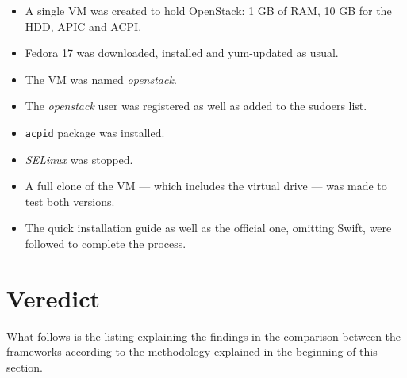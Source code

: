 \begin{itemize}
 \item A single VM was created to hold OpenStack: 1 GB of RAM, 10 GB for the HDD, APIC and ACPI.
 \item Fedora 17 was downloaded, installed and yum-updated as usual.
 \item The VM was named \emph{openstack}.
 \item The \emph{openstack} user was registered as well as added to the sudoers list.
 \item \texttt{acpid} package was installed.
 \item \emph{SELinux} was stopped.
 \item A full clone of the VM --- which includes the virtual drive --- was made to test both versions.
 \item The quick installation guide as well as the official one, omitting Swift, were followed to complete the process.
\end{itemize}

\section{Veredict}\label{sec:conclusiones}

\noindent What follows is the listing explaining the findings in the comparison between the frameworks according to the methodology explained in the beginning of this section.
 
